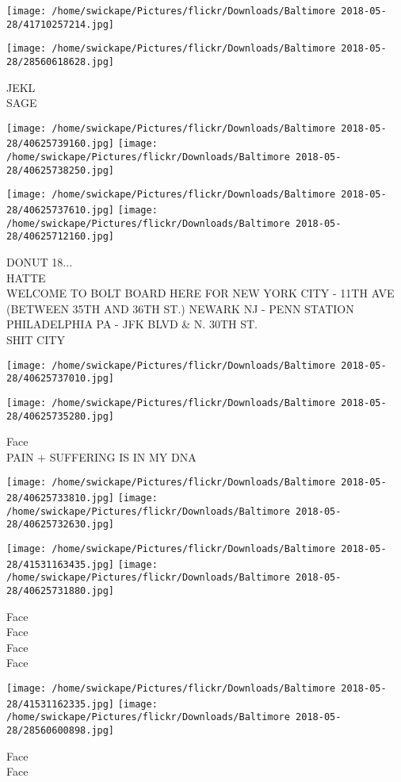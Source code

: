 \documentclass[10pt,letterpaper]{article}
\begin{document}
\texttt{[image: /home/swickape/Pictures/flickr/Downloads/Baltimore 2018-05-28/41710257214.jpg]}

\vspace{0.25in}
\texttt{[image: /home/swickape/Pictures/flickr/Downloads/Baltimore 2018-05-28/28560618628.jpg]}

JEKL\\
SAGE\\
\pagebreak

\texttt{[image: /home/swickape/Pictures/flickr/Downloads/Baltimore 2018-05-28/40625739160.jpg]}
\texttt{[image: /home/swickape/Pictures/flickr/Downloads/Baltimore 2018-05-28/40625738250.jpg]}

\texttt{[image: /home/swickape/Pictures/flickr/Downloads/Baltimore 2018-05-28/40625737610.jpg]}
\texttt{[image: /home/swickape/Pictures/flickr/Downloads/Baltimore 2018-05-28/40625712160.jpg]}

DONUT 18...\\
HATTE\\
WELCOME TO BOLT BOARD HERE FOR NEW YORK CITY {-} 11TH AVE (BETWEEN 35TH AND 36TH ST.) NEWARK NJ {-} PENN STATION PHILADELPHIA PA {-} JFK BLVD \& N. 30TH ST.\\
SHIT CITY\\
\pagebreak

\texttt{[image: /home/swickape/Pictures/flickr/Downloads/Baltimore 2018-05-28/40625737010.jpg]}

\vspace{0.25in}
\texttt{[image: /home/swickape/Pictures/flickr/Downloads/Baltimore 2018-05-28/40625735280.jpg]}

Face\\
PAIN + SUFFERING IS IN MY DNA\\
\pagebreak

\texttt{[image: /home/swickape/Pictures/flickr/Downloads/Baltimore 2018-05-28/40625733810.jpg]}
\texttt{[image: /home/swickape/Pictures/flickr/Downloads/Baltimore 2018-05-28/40625732630.jpg]}

\texttt{[image: /home/swickape/Pictures/flickr/Downloads/Baltimore 2018-05-28/41531163435.jpg]}
\texttt{[image: /home/swickape/Pictures/flickr/Downloads/Baltimore 2018-05-28/40625731880.jpg]}

Face\\
Face\\
Face\\
Face\\
\pagebreak

\texttt{[image: /home/swickape/Pictures/flickr/Downloads/Baltimore 2018-05-28/41531162335.jpg]}
\texttt{[image: /home/swickape/Pictures/flickr/Downloads/Baltimore 2018-05-28/28560600898.jpg]}

Face\\
Face\\
\pagebreak
\end{document}
